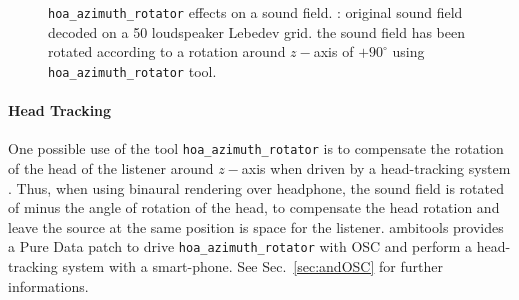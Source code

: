 \documentclass[10pt,a4paper]{article}
\begin{document}
\begin{figure}[!ht]
\centering
{}
\caption{\lstinline'hoa_azimuth_rotator' effects on a sound field. : original sound field decoded on a 50 loudspeaker Lebedev grid.  the sound field has been rotated according to a rotation around $z-$axis of $+90^\circ$ using \lstinline'hoa_azimuth_rotator' tool.}
\label{fig:hoa_azimuth_rotator_2}
\end{figure}
\paragraph{Head Tracking}
One possible use of the tool \lstinline'hoa_azimuth_rotator' is to compensate the rotation of the head of the listener around $z-$axis when driven by a head-tracking system \cite{noisternig20033d}. Thus, when using binaural rendering over headphone, the sound field is rotated of minus the angle of rotation of the head, to compensate the head rotation and leave the source at the same position is space for the listener. ambitools provides a Pure Data patch to drive \lstinline'hoa_azimuth_rotator' with OSC and perform a head-tracking system with a smart-phone. See Sec.~\ref{sec:andOSC} for further informations.

\pagebreak
\end{document}
